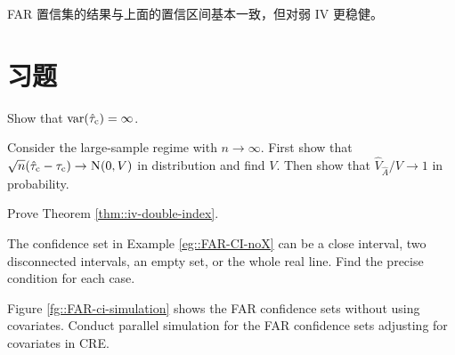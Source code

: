 FAR 置信集的结果与上面的置信区间基本一致，但对弱 IV 更稳健。

\section{习题}\label{sec:21-homework}

\begin{HomeworkProblem}\label{exr:21-1}

Show that $\textup{var}(\hat{\tau}_{\textup{c}}) = \infty$.



\end{HomeworkProblem}

\begin{HomeworkProblem}\label{exr:21-2}


Consider the large-sample regime with $n\rightarrow \infty$.
First show that $\sqrt{n}(\hat{\tau}_{\textup{c}} - \tau_{\textup{c}}) \rightarrow \textsc{N}(0, V)$ in distribution and find $V$. Then show that $\hat{V}_{\hat{A}} /V \rightarrow 1$ in probability.




\end{HomeworkProblem}

\begin{HomeworkProblem}\label{exr:21-3}

 Prove Theorem \ref{thm::iv-double-index}.



\end{HomeworkProblem}

\begin{HomeworkProblem}\label{exr:21-4}

The confidence set in Example \ref{eg::FAR-CI-noX} can be a close interval, two disconnected intervals, an empty set, or the whole real line. Find the precise condition for each case.


\end{HomeworkProblem}

\begin{HomeworkProblem}\label{exr:21-5}

Figure \ref{fg::FAR-ci-simulation} shows the FAR confidence sets without using covariates. Conduct parallel simulation for
 the FAR confidence sets adjusting for covariates in CRE.


\end{HomeworkProblem}

